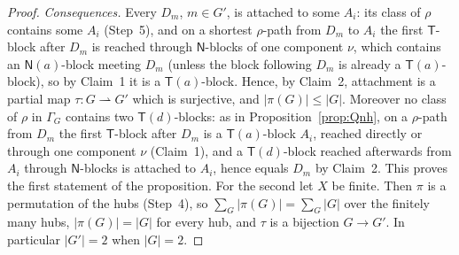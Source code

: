 \documentclass[11pt]{amsart}
\theoremstyle{definition}
\newcommand{\T}{\mathsf{T}}
\newcommand{\N}{\mathsf{N}}
\begin{document}
\begin{proof}
\emph{Consequences.} Every $D_m$, $m\in G'$, is attached to some $A_i$: its class of $\rho$ contains some $A_i$ (Step~5), and on a shortest $\rho$-path from $D_m$ to $A_i$ the first $\T$-block after $D_m$ is reached through $\N$-blocks of one component $\nu$, which contains an $\N(a)$-block meeting $D_m$ (unless the block following $D_m$ is already a $\T(a)$-block), so by Claim~1 it is a $\T(a)$-block. Hence, by Claim~2, attachment is a partial map $\tau\colon G\rightharpoonup G'$ which is surjective, and $|\pi(G)|\le|G|$. Moreover no class of $\rho$ in $\Gamma_G$ contains two $\T(d)$-blocks: as in Proposition~\ref{prop:Qnh}, on a $\rho$-path from $D_m$ the first $\T$-block after $D_m$ is a $\T(a)$-block $A_i$, reached directly or through one component $\nu$ (Claim~1), and a $\T(d)$-block reached afterwards from $A_i$ through $\N$-blocks is attached to $A_i$, hence equals $D_m$ by Claim~2. This proves the first statement of the proposition. For the second let $X$ be finite. Then $\pi$ is a permutation of the hubs (Step~4), so $\sum_G|\pi(G)|=\sum_G|G|$ over the finitely many hubs, $|\pi(G)|=|G|$ for every hub, and $\tau$ is a bijection $G\to G'$. In particular $|G'|=2$ when $|G|=2$.


\end{proof}
\end{document}
